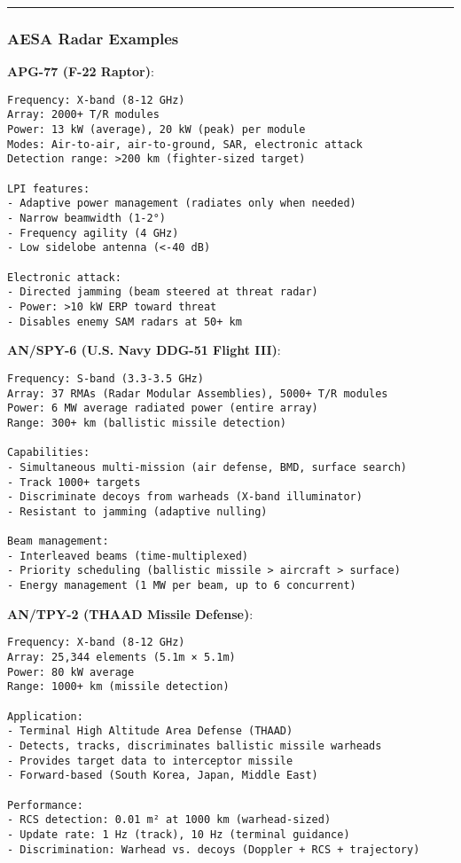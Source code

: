 \begin{center}\rule{0.5\linewidth}{0.5pt}\end{center}

\subsubsection{AESA Radar Examples}\label{aesa-radar-examples}

\textbf{APG-77 (F-22 Raptor)}:

\begin{verbatim}
Frequency: X-band (8-12 GHz)
Array: 2000+ T/R modules
Power: 13 kW (average), 20 kW (peak) per module
Modes: Air-to-air, air-to-ground, SAR, electronic attack
Detection range: >200 km (fighter-sized target)

LPI features:
- Adaptive power management (radiates only when needed)
- Narrow beamwidth (1-2°)
- Frequency agility (4 GHz)
- Low sidelobe antenna (<-40 dB)

Electronic attack:
- Directed jamming (beam steered at threat radar)
- Power: >10 kW ERP toward threat
- Disables enemy SAM radars at 50+ km
\end{verbatim}

\textbf{AN/SPY-6 (U.S. Navy DDG-51 Flight III)}:

\begin{verbatim}
Frequency: S-band (3.3-3.5 GHz)
Array: 37 RMAs (Radar Modular Assemblies), 5000+ T/R modules
Power: 6 MW average radiated power (entire array)
Range: 300+ km (ballistic missile detection)

Capabilities:
- Simultaneous multi-mission (air defense, BMD, surface search)
- Track 1000+ targets
- Discriminate decoys from warheads (X-band illuminator)
- Resistant to jamming (adaptive nulling)

Beam management:
- Interleaved beams (time-multiplexed)
- Priority scheduling (ballistic missile > aircraft > surface)
- Energy management (1 MW per beam, up to 6 concurrent)
\end{verbatim}

\textbf{AN/TPY-2 (THAAD Missile Defense)}:

\begin{verbatim}
Frequency: X-band (8-12 GHz)
Array: 25,344 elements (5.1m × 5.1m)
Power: 80 kW average
Range: 1000+ km (missile detection)

Application:
- Terminal High Altitude Area Defense (THAAD)
- Detects, tracks, discriminates ballistic missile warheads
- Provides target data to interceptor missile
- Forward-based (South Korea, Japan, Middle East)

Performance:
- RCS detection: 0.01 m² at 1000 km (warhead-sized)
- Update rate: 1 Hz (track), 10 Hz (terminal guidance)
- Discrimination: Warhead vs. decoys (Doppler + RCS + trajectory)
\end{verbatim}

